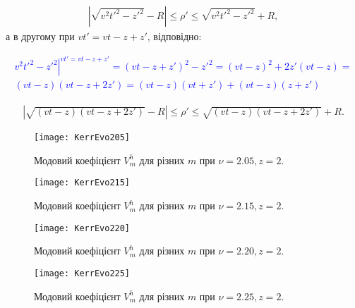 \begin{equation} \begin{aligned}
\left| \sqrt{v^2t'^2 - z'^2} - R \right| \leq \rho' \leq 
\sqrt{v^2t'^2 - z'^2} + R,
\end{aligned} \end{equation}
%
а в другому при $ vt' = vt - z + z' $, відповідно:

\textcolor{blue} { \begin{equation*} \begin{aligned}
\left. v^2 t'^2 - z'^2 \right|^{vt' = vt - z + z'} = 
(vt - z + z')^2 - z'^2 = (vt - z)^2 + 2 z' (vt - z) = \\
(vt - z) (vt - z + 2 z') = (vt - z) (vt + z') + (vt - z) (z + z')
\end{aligned} \end{equation*} }

\begin{equation} \begin{aligned}
\left| \sqrt{(vt - z) (vt - z + 2 z')} - R \right| \leq \rho' \leq 
\sqrt{(vt - z) (vt - z + 2 z')} + R.
\end{aligned} \end{equation}

\begin{figure}[htbp] \begin{center}
\texttt{[image: KerrEvo205]}
\caption{Модовий коефіцієнт $ V_m^h $ для 
різних $ m $ при $ \nu = 2.05, z = 2 $.} 
\label{fig:KerrEvo205}
\end{center} \end{figure}

\begin{figure}[htbp] \begin{center}
\texttt{[image: KerrEvo215]}
\caption{Модовий коефіцієнт $ V_m^h $ для 
різних $ m $ при $ \nu = 2.15, z = 2 $.} 
\label{fig:KerrEvo215}
\end{center} \end{figure}

\begin{figure}[htbp] \begin{center}
\texttt{[image: KerrEvo220]}
\caption{Модовий коефіцієнт $ V_m^h $ для 
різних $ m $ при $ \nu = 2.20, z = 2 $.} 
\label{fig:KerrEvo220}
\end{center} \end{figure}

\begin{figure}[htbp] \begin{center}
\texttt{[image: KerrEvo225]}
\caption{Модовий коефіцієнт $ V_m^h $ для 
різних $ m $ при $ \nu = 2.25, z = 2 $.} 
\label{fig:KerrEvo225}
\end{center} \end{figure}

